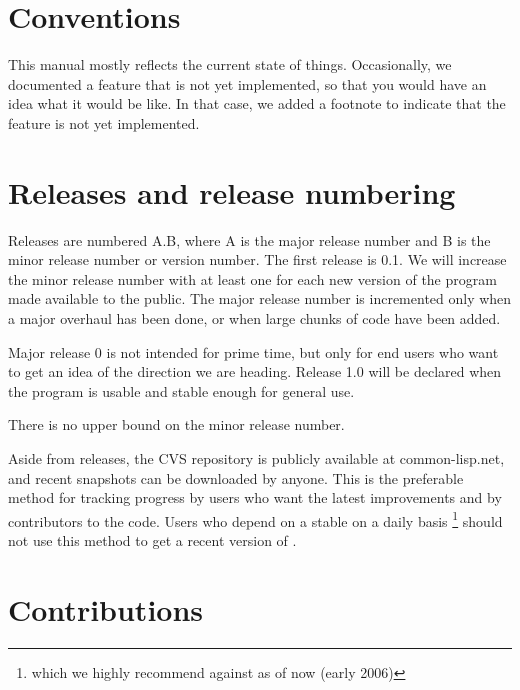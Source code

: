 
\section{Conventions}

This manual mostly reflects the current state of things.  Occasionally,
we documented a feature that is not yet implemented, so that you would
have an idea what it would be like.  In that case, we added a footnote
to indicate that the feature is not yet implemented. 

\section{Releases and release numbering}

Releases are numbered A.B, where A is the major release number and B
is the minor release number or version number.  The first release is
0.1.  We will increase the minor release number with at least one for
each new version of the program made available to the public.  The
major release number is incremented only when a major overhaul has
been done, or when large chunks of code have been added.  

Major release 0 is not intended for prime time, but only for end users
who want to get an idea of the direction we are heading.  Release 1.0
will be declared when the program is usable and stable enough for
general use. 

There is no upper bound on the minor release number.

Aside from releases, the CVS repository is publicly available at
common-lisp.net, and recent snapshots can be downloaded by anyone.  
This is the preferable method for tracking {\gs} progress by users who
want the latest improvements and by contributors to the {\gs} code.
Users who depend on a stable {\gs} on a daily basis \footnote{which we
  highly recommend against as of now (early 2006)} should not use this
method to get a recent version of {\gs}.

\section{Contributions}

